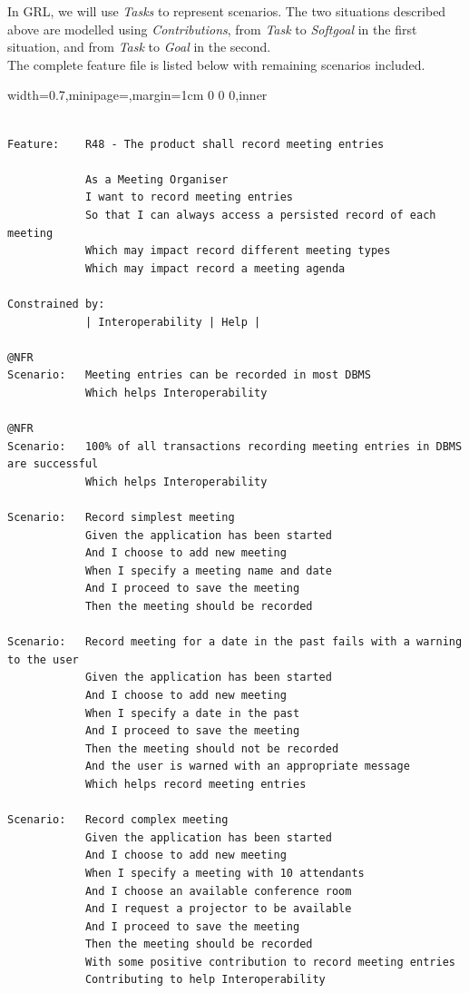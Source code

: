 \documentclass[dissertation,final]{softeng}
\newenvironment{featurecode}[1]
{ \lrbox\featurebox \begin{adjustbox}{width=#1\textwidth,minipage=\textwidth,margin=1cm 0 0 0,inner} }
{ \end{adjustbox}\endlrbox}
\newenvironment{featurelist}[2]
{
\newcommand{\setcaption}{\caption{#1}}
\newcommand{\setlabel}{\label{#2}}
}
{\begin{listing}[h!]\centering\usebox\featurebox\setcaption\setlabel\end{listing}}
\begin{document}
In GRL, we will use \emph{Tasks} to represent scenarios. The two situations described above are modelled using \emph{Contributions}, from \emph{Task} to \emph{Softgoal} in the first situation, and from \emph{Task} to \emph{Goal} in the second.\\

The complete feature file is listed below with remaining scenarios included.

\begin{featurelist}{Changes to Gherkin -- Complete feature}{lst:gherkin_changes_complete}
\begin{featurecode}{0.7}
\begin{verbatim}

Feature:    R48 - The product shall record meeting entries

            As a Meeting Organiser
            I want to record meeting entries
            So that I can always access a persisted record of each meeting
            Which may impact record different meeting types
            Which may impact record a meeting agenda
	
Constrained by:
            | Interoperability | Help |

@NFR
Scenario:   Meeting entries can be recorded in most DBMS
            Which helps Interoperability

@NFR	
Scenario:   100% of all transactions recording meeting entries in DBMS are successful
            Which helps Interoperability
	
Scenario:   Record simplest meeting
            Given the application has been started
            And I choose to add new meeting
            When I specify a meeting name and date
            And I proceed to save the meeting
            Then the meeting should be recorded
	
Scenario:   Record meeting for a date in the past fails with a warning to the user
            Given the application has been started
            And I choose to add new meeting
            When I specify a date in the past
            And I proceed to save the meeting
            Then the meeting should not be recorded
            And the user is warned with an appropriate message
            Which helps record meeting entries

Scenario:   Record complex meeting
            Given the application has been started
            And I choose to add new meeting
            When I specify a meeting with 10 attendants
            And I choose an available conference room
            And I request a projector to be available
            And I proceed to save the meeting
            Then the meeting should be recorded
            With some positive contribution to record meeting entries
            Contributing to help Interoperability
\end{verbatim}
\end{featurecode}
\end{featurelist}
\end{document}
